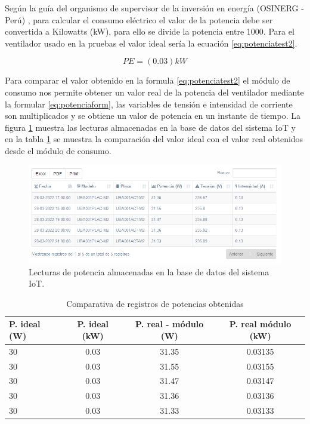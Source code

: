 Según la guía del organismo de supervisor de la inversión en energía (OSINERG - Perú) \citep{BOOK:3}, para calcular el consumo eléctrico el valor de la potencia  debe ser convertida a Kilowatts (kW), para ello se divide la potencia entre 1000. Para el ventilador usado en la pruebas el valor ideal sería la ecuación \ref{eq:potenciatest2}.

\begin{equation}
	\label{eq:potenciatest2}
	PE = \left( 0.03 \right) kW
\end{equation}

Para comparar el valor obtenido en la formula \ref{eq:potenciatest2} el módulo de consumo nos permite obtener un valor real de la potencia del ventilador mediante la formular \ref{eq:potenciaform}, las variables de tensión e intensidad de corriente son multiplicados y se obtiene un valor de potencia en un instante de tiempo. La figura \ref{fig:registroPotencia} muestra las lecturas almacenadas en la base de datos del sistema IoT y en la tabla \ref{tab:tablapotencias} se muestra la comparación del valor ideal con el valor real obtenidos desde el módulo de consumo.

\begin{figure}[htpb]
\centering 
\includegraphics[width=1.0\textwidth]{./Figures/test/consumo/lecturas.png}
\caption{Lecturas de potencia almacenadas en la base de datos del sistema IoT.}
\label{fig:registroPotencia}
\end{figure}


\begin{table}[h]
	\centering
	\caption[Comparativa de registros de potencias obtenidas]{Comparativa de registros de potencias obtenidas}
	\begin{tabular}{l c c c}    
		\toprule
		\textbf{P. ideal (W)} 	 & \textbf{P. ideal (kW)}  & \textbf{P. real - módulo (W)} &\textbf{P. real módulo (kW)} \\
		\midrule
		30 & 0.03 & 31.35 & 0.03135\\		
		30& 0.03 & 31.55  &0.03155 \\
		30& 0.03 & 31.47 & 0.03147\\		
		30& 0.03 & 31.36 & 0.03136\\		
		30& 0.03 & 31.33 & 0.03133\\
		\bottomrule
		\hline
	\end{tabular}
	\label{tab:tablapotencias}
\end{table}


